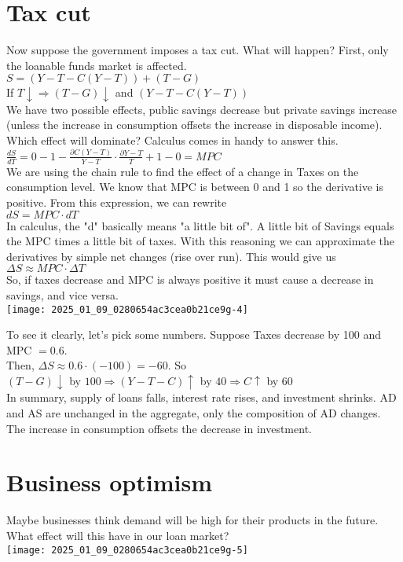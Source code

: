 \documentclass[10pt]{article}
\begin{document}
\section*{Tax cut}
Now suppose the government imposes a tax cut. What will happen? First, only the loanable funds market is affected.\\
$S=(Y-T-C(Y-T))+(T-G)$\\
If $T \downarrow \Rightarrow(T-G) \downarrow$ and $(Y-T-C(Y-T))$\\
We have two possible effects, public savings decrease but private savings increase (unless the increase in consumption offsets the increase in disposable income). Which effect will dominate? Calculus comes in handy to answer this.\\
$\frac{d S}{d T}=0-1-\frac{\partial C(Y-T)}{Y-T} \cdot \frac{\partial Y-T}{T}+1-0=M P C$\\
We are using the chain rule to find the effect of a change in Taxes on the consumption level. We know that MPC is between 0 and 1 so the derivative is positive. From this expression, we can rewrite\\
$d S=M P C \cdot d T$\\
In calculus, the "d" basically means "a little bit of". A little bit of Savings equals the MPC times a little bit of taxes. With this reasoning we can approximate the derivatives by simple net changes (rise over run). This would give us\\
$\Delta S \approx M P C \cdot \Delta T$\\
So, if taxes decrease and MPC is always positive it must cause a decrease in savings, and vice versa.\\
\texttt{[image: 2025\_01\_09\_0280654ac3cea0b21ce9g-4]}

To see it clearly, let's pick some numbers. Suppose Taxes decrease by 100 and MPC $=0.6$.\\
Then, $\Delta S \approx 0.6 \cdot(-100)=-60$. So\\
$(T-G) \downarrow$ by $100 \Rightarrow(Y-T-C) \uparrow$ by $40 \Rightarrow C \uparrow$ by 60\\
In summary, supply of loans falls, interest rate rises, and investment shrinks. AD and AS are unchanged in the aggregate, only the composition of AD changes. The increase in consumption offsets the decrease in investment.

\section*{Business optimism}
Maybe businesses think demand will be high for their products in the future. What effect will this have in our loan market?\\
\texttt{[image: 2025\_01\_09\_0280654ac3cea0b21ce9g-5]}
\end{document}
